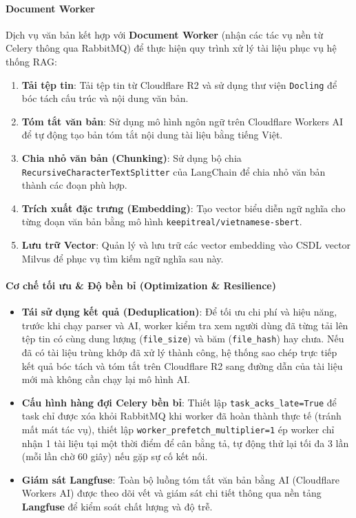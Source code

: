 \paragraph{Document Worker}

Dịch vụ văn bản kết hợp với \textbf{Document Worker} (nhận các tác vụ nền từ Celery thông qua RabbitMQ) để thực hiện quy trình xử lý tài liệu phục vụ hệ thống RAG:

\begin{enumerate}
\item \textbf{Tải tệp tin}: Tải tệp tin từ Cloudflare R2 và sử dụng thư viện \texttt{Docling} để bóc tách cấu trúc và nội dung văn bản.
\item \textbf{Tóm tắt văn bản}: Sử dụng mô hình ngôn ngữ trên Cloudflare Workers AI để tự động tạo bản tóm tắt nội dung tài liệu bằng tiếng Việt.
\item \textbf{Chia nhỏ văn bản (Chunking)}: Sử dụng bộ chia \texttt{RecursiveCharacterTextSplitter} của LangChain để chia nhỏ văn bản thành các đoạn phù hợp.
\item \textbf{Trích xuất đặc trưng (Embedding)}: Tạo vector biểu diễn ngữ nghĩa cho từng đoạn văn bản bằng mô hình \texttt{keepitreal/vietnamese-sbert}.
\item \textbf{Lưu trữ Vector}: Quản lý và lưu trữ các vector embedding vào CSDL vector Milvus để phục vụ tìm kiếm ngữ nghĩa sau này.
\end{enumerate}

\paragraph{Cơ chế tối ưu \& Độ bền bỉ (Optimization \& Resilience)}

\begin{itemize}
\item \textbf{Tái sử dụng kết quả (Deduplication)}: Để tối ưu chi phí và hiệu năng, trước khi chạy parser và AI, worker kiểm tra xem người dùng đã từng tải lên tệp tin có cùng dung lượng (\texttt{file\_size}) và băm (\texttt{file\_hash}) hay chưa. Nếu đã có tài liệu trùng khớp đã xử lý thành công, hệ thống sao chép trực tiếp kết quả bóc tách và tóm tắt trên Cloudflare R2 sang đường dẫn của tài liệu mới mà không cần chạy lại mô hình AI.

\item \textbf{Cấu hình hàng đợi Celery bền bỉ}: Thiết lập \texttt{task\_acks\_late=True} để task chỉ được xóa khỏi RabbitMQ khi worker đã hoàn thành thực tế (tránh mất mát tác vụ), thiết lập \texttt{worker\_prefetch\_multiplier=1} ép worker chỉ nhận 1 tài liệu tại một thời điểm để cân bằng tả, tự động thử lại tối đa 3 lần (mỗi lần chờ 60 giây) nếu gặp sự cố kết nối.

\item \textbf{Giám sát Langfuse}: Toàn bộ luồng tóm tắt văn bản bằng AI (Cloudflare Workers AI) được theo dõi vết và giám sát chi tiết thông qua nền tảng \textbf{Langfuse} để kiểm soát chất lượng và độ trễ.
\end{itemize}

